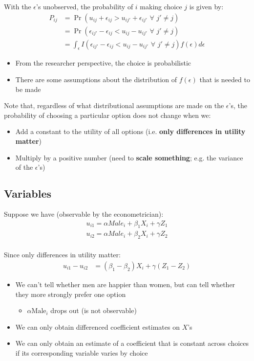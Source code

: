 \documentclass[11pt]{article}
\begin{document}
With the \(\epsilon\)'s unobserved, the probability of \(i\) making choice \(j\) is given by:
\begin{align*}
P_{ij}&=\Pr(u_{ij}+\epsilon_{ij}>u_{ij'}+\epsilon_{ij'}\,\,\forall\,\, j'\neq j)\\
&=\Pr(\epsilon_{ij'}-\epsilon_{ij}<u_{ij}-u_{ij'}\,\,\forall\,\, j'\neq j)\\ %
&=\int_{\epsilon}I(\epsilon_{ij'}-\epsilon_{ij}<u_{ij}-u_{ij'}\,\,\forall\,\, j'\neq j)f(\epsilon)d\epsilon
\end{align*}
\begin{itemize}
\item From the researcher perspective, the choice is probabilistic
\item There are some assumptions about the distribution of \(f(\epsilon)\) that is needed to be made
\end{itemize}


Note that, regardless of what distributional assumptions are made on the \(\epsilon\)'s, the probability of choosing a particular option does not change when we:
\begin{itemize}
\item Add a constant to the utility of all options (i.e. \textbf{only differences in utility matter})
\item Multiply by a positive number (need to \textbf{scale something}; e.g. the variance of the \(\epsilon\)'s)
\end{itemize}

\subsection{Variables}
\label{sec:orgb493aeb}

Suppose we have (observable by the econometrician):
\begin{eqnarray*}
u_{i1}=\alpha Male_i+\beta_1 X_i + \gamma Z_1\\
u_{i2}=\alpha Male_i+\beta_2 X_i+\gamma Z_2\\
\end{eqnarray*}

Since only differences in utility matter:
\begin{align*}
u_{i1}-u_{i2}&=(\beta_1-\beta_2)X_i+\gamma (Z_1-Z_2)
\end{align*}

\begin{itemize}
\item We can't tell whether men are happier than women, but can tell whether they more strongly prefer one option
\begin{itemize}
\item \(\alpha\text{Male}_i\) drops out (is not observable)
\end{itemize}
\item We can only obtain differenced coefficient estimates on \(X\)'s
\item We can only obtain an estimate of a coefficient that is constant across choices if its corresponding variable varies by choice
\end{itemize}
\end{document}
